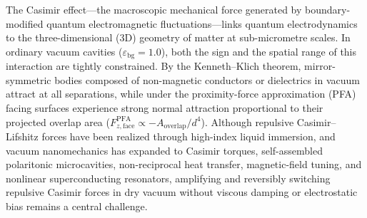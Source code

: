 \documentclass[pdflatex,sn-nature]{sn-jnl}
\begin{document}
The Casimir effect---the macroscopic mechanical force generated by boundary-modified quantum electromagnetic fluctuations\cite{casimir1948,casimirpolder1948,bordag2009}---links quantum electrodynamics to the three-dimensional (3D) geometry of matter at sub-micrometre scales\cite{rodriguez2011}. In ordinary vacuum cavities ($\varepsilon_{\mathrm{bg}}=1.0$), both the sign and the spatial range of this interaction are tightly constrained. By the Kenneth--Klich theorem\cite{kennethklich2006}, mirror-symmetric bodies composed of non-magnetic conductors or dielectrics in vacuum attract at all separations, while under the proximity-force approximation (PFA) facing surfaces experience strong normal attraction proportional to their projected overlap area ($F_{z,\mathrm{face}}^{\mathrm{PFA}} \propto -A_{\mathrm{overlap}}/d^4$). Although repulsive Casimir--Lifshitz forces have been realized through high-index liquid immersion\cite{munday2009}, and vacuum nanomechanics has expanded to Casimir torques\cite{somers2018}, self-assembled polaritonic microcavities\cite{munkhbat2021}, non-reciprocal heat transfer\cite{Xu2022}, magnetic-field tuning\cite{Zhang2024}, and nonlinear superconducting resonators\cite{casimir_drum2025,dejong2026}, amplifying and reversibly switching repulsive Casimir forces in dry vacuum without viscous damping or electrostatic bias remains a central challenge\cite{rodriguez2011}.
\end{document}
